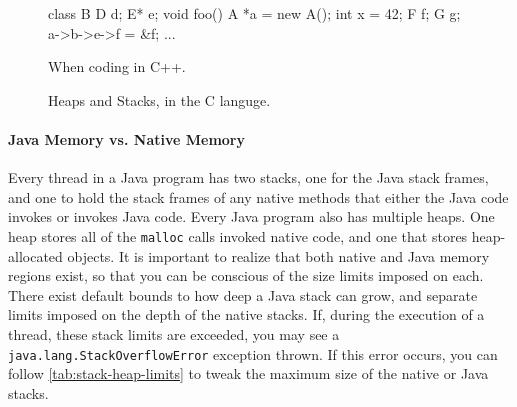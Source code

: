 \begin{figure}
\begin{subfloat}
\begin{minipage}[b]{0.4\textwidth}
\begin{shortlisting}
class B {
  D d; 
  E* e;
}
void foo() {
  A *a = new A();
  int x = 42;
  F f;
  G g;
  a->b->e->f = &f;
  ...
}
\end{shortlisting}
\end{minipage}
\caption{When coding in C++.}
\end{subfloat}
\caption{Heaps and Stacks, in the C languge.}
\end{figure}




\paragraph{Java Memory vs. Native Memory}
Every thread in a Java program has two stacks, one for the Java stack frames,
and one to hold the stack frames of any native methods that either the Java code
invokes or invokes Java code. Every Java program also has multiple heaps. One
heap stores all of the {\tt malloc} calls invoked native code, and one that
stores heap-allocated objects. It is important to realize that both native and
Java memory regions exist, so that you can be conscious of the size limits
imposed on each. There exist default bounds to how deep a Java stack can grow,
and separate limits imposed on the depth of the native stacks. If, during
the execution of a thread, these stack limits are exceeded, you may see a {\tt
java.lang.StackOverflowError} exception
thrown. If this error occurs, you can follow
\autoref{tab:stack-heap-limits} to tweak the maximum size of the native or Java
stacks.

